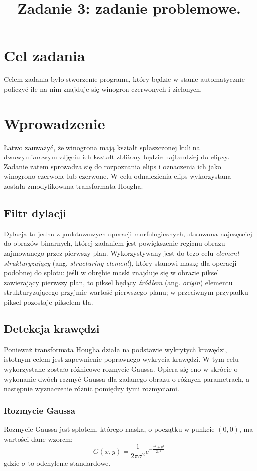 \documentclass{classrep}
\author{%
  \studentinfo{Michał Janiszewski}{169485}
}
\title{Zadanie 3: zadanie problemowe.}
\begin{document}
\maketitle

\section{Cel zadania}
Celem zadania było stworzenie programu, który będzie w stanie automatycznie policzyć ile na nim znajduje się winogron czerwonych i zielonych.

\section{Wprowadzenie}
Łatwo zauważyć, że winogrona mają kształt spłaszczonej kuli \ppauza na dwuwymiarowym zdjęciu ich kształt zbliżony będzie najbardziej do elipsy. Zadanie zatem sprowadza się do rozpoznania elips i oznaczenia ich jako winogrono czerwone lub czerwone. W celu odnalezienia elips wykorzystana została zmodyfikowana transformata Hougha.

\subsection{Filtr dylacji}
Dylacja to jedna z podstawowych operacji morfologicznych, stosowana najczęsciej do obrazów binarnych, której zadaniem jest powiększenie regionu obrazu zajmowanego przez pierwszy plan. Wykorzystywany jest do tego celu \textit{element strukturyzujący} (ang. \textit{structuring element}), który stanowi maskę dla operacji podobnej do splotu: jeśli w obrębie maski znajduje się w obrazie piksel zawierający pierwszy plan, to piksel będący \textit{źródłem} (ang. \textit{origin}) elementu strukturyzującego przyjmie wartość pierwszego planu; w przeciwnym przypadku piksel pozostaje pikselem tła.

\subsection{Detekcja krawędzi}
Ponieważ transformata Hougha działa na podstawie wykrytych krawędzi, istotnym celem jest zapewnienie poprawnego wykrycia krawędzi. W tym celu wykorzystane zostało różnicowe rozmycie Gaussa. Opiera się ono w skrócie o wykonanie dwóch rozmyć Gaussa dla zadanego obrazu o różnych parametrach, a następnie wyznaczenie różnic pomiędzy tymi rozmyciami.

\subsubsection{Rozmycie Gaussa}
Rozmycie Gaussa jest splotem, którego maska, o początku w punkcie $(0, 0)$, ma wartości dane wzorem:
\begin{equation}
  G(x,y) = \frac{1}{2\pi \sigma^2}e^{-\frac{x^2 + y^2}{2\sigma^2}}
\end{equation}
gdzie $\sigma$ to odchylenie standardowe.
\end{document}
